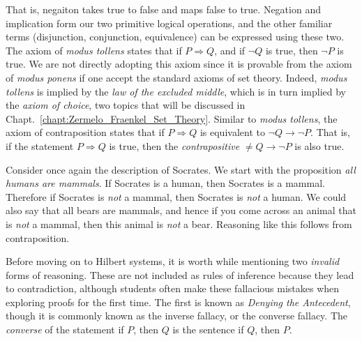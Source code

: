         That is, negaiton takes true to false and maps false to true. Negation
        and implication form our two primitive logical operations, and the other
        familiar terms (disjunction, conjunction, equivalence) can be expressed
        using these two. The axiom of \textit{modus tollens} states that if
        $P\Rightarrow{Q}$, and if $\neg{Q}$ is true, then $\neg{P}$ is true. We
        are not directly adopting this axiom since it is provable from the
        axiom of \textit{modus ponens} if one accept the standard axioms of set
        theory. Indeed, \textit{modus tollens} is implied by the
        \textit{law of the excluded middle},
        which is in turn implied by the
        \textit{axiom of choice}, two topics that will be
        discussed in Chapt.~\ref{chapt:Zermelo_Fraenkel_Set_Theory}. Similar to
        \textit{modus tollens}, the axiom of contraposition states that if
        $P\Rightarrow{Q}$ is equivalent to $\neg{Q}\rightarrow\neg{P}$. That is,
        if the statement $P\Rightarrow{Q}$ is true, then the
        \textit{contrapositive}
        $\neq{Q}\rightarrow\neg{P}$ is also true.
        \begin{example}
            Consider once again the description of Socrates. We start with the
            proposition \textit{all humans are mammals}. If Socrates is a human,
            then Socrates is a mammal. Therefore if Socrates is \textit{not} a
            mammal, then Socrates is \textit{not} a human. We could also say
            that all bears are mammals, and hence if you come across an animal
            that is \textit{not} a mammal, then this animal is \textit{not} a
            bear. Reasoning like this follows from contraposition.
        \end{example}
        Before moving on to Hilbert systems, it is worth while mentioning two
        \textit{invalid} forms of reasoning. These are not included as rules of
        inference because they lead to contradiction, although students often
        make these fallacious mistakes when exploring proofs for the first time.
        The first is known as
        \textit{Denying the Antecedent},
        though it is commonly known as the inverse fallacy, or the converse
        fallacy. The \textit{converse} of the statement if $P$,
        then $Q$ is the sentence if $Q$, then $P$.
